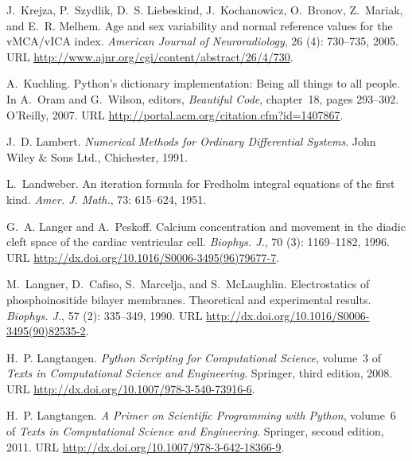 \begin{thebibliography}{467}
J.~Krejza, P.~Szydlik, D.~S. Liebeskind, J.~Kochanowicz, O.~Bronov, Z.~Mariak,
  and E.~R. Melhem.
\newblock Age and sex variability and normal reference values for the
  {vMCA/vICA} index.
\newblock \emph{American Journal of Neuroradiology}, 26 (4):
  730--735, 2005.
\newblock URL \url{http://www.ajnr.org/cgi/content/abstract/26/4/730}.

A.~Kuchling.
\newblock Python's dictionary implementation: Being all things to all people.
\newblock In A.~Oram and G.~Wilson, editors, \emph{Beautiful Code}, chapter~18,
  pages 293--302. O'Reilly, 2007.
\newblock URL \url{http://portal.acm.org/citation.cfm?id=1407867}.

J.~D. Lambert.
\newblock \emph{Numerical Methods for Ordinary Differential Systems}.
\newblock John Wiley \& Sons Ltd., Chichester, 1991.

L.~Landweber.
\newblock An iteration formula for {F}redholm integral equations of the first
  kind.
\newblock \emph{Amer. J. Math.}, 73: 615--624, 1951.

G.~A. Langer and A.~Peskoff.
\newblock Calcium concentration and movement in the diadic cleft space of the
  cardiac ventricular cell.
\newblock \emph{Biophys. J.}, 70 (3): 1169--1182, 1996.
\newblock URL \url{http://dx.doi.org/10.1016/S0006-3495(96)79677-7}.

M.~Langner, D.~Cafiso, S.~Marcelja, and S.~McLaughlin.
\newblock Electrostatics of phosphoinositide bilayer membranes. {T}heoretical
  and experimental results.
\newblock \emph{Biophys. J.}, 57 (2): 335--349, 1990.
\newblock URL \url{http://dx.doi.org/10.1016/S0006-3495(90)82535-2}.

H.~P. Langtangen.
\newblock \emph{Python Scripting for Computational Science}, volume~3 of
  \emph{Texts in Computational Science and Engineering}.
\newblock Springer, third edition, 2008.
\newblock URL \url{http://dx.doi.org/10.1007/978-3-540-73916-6}.

H.~P. Langtangen.
\newblock \emph{A Primer on Scientific Programming with Python}, volume~6 of
  \emph{Texts in Computational Science and Engineering}.
\newblock Springer, second edition, 2011.
\newblock URL \url{http://dx.doi.org/10.1007/978-3-642-18366-9}.


\end{thebibliography}
